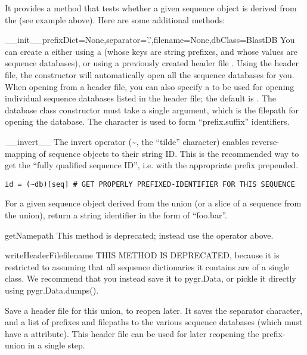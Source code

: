 \documentclass{howto}
\begin{document}
It provides a  method that tests whether
a given sequence object is derived from the 
(see example above).  Here are some additional methods:

\begin{funcdesc}{__init__}{prefixDict=None,separator='.',filename=None,dbClass=BlastDB}
  You can create a  either using
  a  (whose keys are string prefixes, and whose 
  values are sequence databases), or using a previously created
  header file .  
  Using the header file, the constructor will
  automatically open all the sequence databases for you.
  When opening from a header file, you can also specify a
   to be used for opening individual sequence databases
  listed in the header file; the default is .
  The database class constructor must take a single argument,
  which is the filepath for opening the database.  The 
   character is used to form ``prefix.suffix''
  identifiers.
\end{funcdesc}

\begin{funcdesc}{__invert__}{}
  The invert operator (\textasciitilde, the ``tilde'' character) 
  enables reverse-mapping of sequence objects to their string ID.
  This is the recommended way to get the ``fully qualified sequence ID'', i.e. with
  the appropriate prefix prepended. 
\begin{verbatim}
id = (~db)[seq] # GET PROPERLY PREFIXED-IDENTIFIER FOR THIS SEQUENCE
\end{verbatim}
  For a given sequence object  derived from the union
  (or a slice of a sequence from the union), return a string identifier
  in the form of ``foo.bar''.  
\end{funcdesc}

\begin{funcdesc}{getName}{path}
  This method is deprecated; instead use the  operator
  above.
\end{funcdesc}

\begin{funcdesc}{writeHeaderFile}{filename}
  THIS METHOD IS DEPRECATED, because it is restricted to
  assuming that all sequence dictionaries it contains
  are of a single class.  We recommend that you instead save
  it to pygr.Data, or pickle it directly using pygr.Data.dumps().

  Save a header file for this union, to reopen later.
  It saves the separator character, and a list of prefixes
  and filepaths to the various sequence databases (which
  must have a  attribute).  This header
  file can be used for later reopening the prefix-union
  in a single step.
\end{funcdesc}
\end{document}
